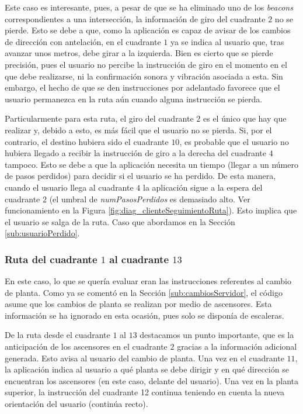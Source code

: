 Este caso es interesante, pues, a pesar de que se ha eliminado uno de los \textit{beacons} correspondientes a una intersección, la información de giro del cuadrante $2$ no se pierde. Esto se debe a que, como la aplicación es capaz de avisar de los cambios de dirección con antelación, en el cuadrante $1$ ya se indica al usuario que, tras avanzar unos metros, debe girar a la izquierda. Bien es cierto que se pierde precisión, pues el usuario no percibe la instrucción de giro en el momento en el que debe realizarse, ni la confirmación sonora y vibración asociada a esta. Sin embargo, el hecho de que se den instrucciones por adelantado favorece que el usuario permanezca en la ruta aún cuando alguna instrucción se pierda. 

Particularmente para esta ruta, el giro del cuadrante $2$ es el único que hay que realizar y, debido a esto, es más fácil que el usuario no se pierda. Si, por el contrario, el destino hubiera sido el cuadrante $10$, es probable que el usuario no hubiera llegado a recibir la instrucción de giro a la derecha del cuadrante $4$ tampoco. Esto se debe a que la aplicación necesita un tiempo (llegar a un número de pasos perdidos) para decidir si el usuario se ha perdido. De esta manera, cuando el usuario llega al cuadrante $4$ la aplicación sigue a la espera del cuadrante $2$ (el umbral de \textit{numPasosPerdidos} es demasiado alto. Ver funcionamiento en la Figura \ref{fig:diag_clienteSeguimientoRuta}). Esto implica que el usuario se salga de la ruta. Caso que abordamos en la Sección \ref{sub:usuarioPerdido}.


\subsubsection{Ruta del cuadrante $1$ al cuadrante $13$}

En este caso, lo que se quería evaluar eran las instrucciones referentes al cambio de planta. Como ya se comentó en la Sección \ref{sub:cambiosServidor}, el código asume que los cambios de planta se realizan por medio de ascensores. Esta información se ha ignorado en esta ocasión, pues solo se disponía de escaleras. 

De la ruta desde el cuadrante $1$ al $13$ destacamos un punto importante, que es la anticipación de los ascensores en el cuadrante $2$ gracias a la información adicional generada. Esto avisa al usuario del cambio de planta. Una vez en el cuadrante $11$, la aplicación indica al usuario a qué planta se debe dirigir y en qué dirección se encuentran los ascensores (en este caso, delante del usuario). Una vez en la planta superior, la instrucción del cuadrante 12 continua teniendo en cuenta la nueva orientación del usuario (continúa recto). 

